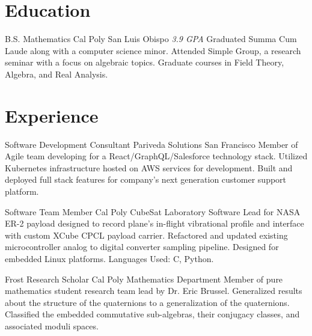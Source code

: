 \documentclass[letterpaper, 11pt, sans]{moderncv}
\begin{document}
\makecvtitle

\section{Education}
        {B.S. Mathematics}
        {Cal Poly}
        {San Luis Obispo}
        {\textit{3.9 GPA}}
        {
            Graduated Summa Cum Laude along with a computer science minor.\newline
            Attended Simple Group, a research seminar with a focus on algebraic topics.\newline
            Graduate courses in Field Theory, Algebra, and Real Analysis. \newline
        }

\section{Experience}

        {Software Development Consultant}
        {Pariveda Solutions}
        {San Francisco}{}
        {
            Member of Agile team developing for a React/GraphQL/Salesforce technology stack.\newline
            Utilized Kubernetes infrastructure hosted on AWS services for development.\newline
            Built and deployed full stack features for company's next generation customer support platform.\newline
        }

        {Software Team Member}
        {Cal Poly CubeSat Laboratory}{}{}
        {
            Software Lead for NASA ER-2 payload designed to record plane's in-flight vibrational profile and interface with custom XCube CPCL payload carrier.\newline
            Refactored and updated existing microcontroller analog to digital converter sampling pipeline.
            Designed for embedded Linux platforms. Languages Used: C, Python.\newline
        }

        {Frost Research Scholar}
        {Cal Poly Mathematics Department}{}{}
        {
            Member of pure mathematics student research team lead by Dr. Eric Brussel.\newline
            Generalized results about the structure of the quaternions to a generalization of the quaternions.\newline
            Classified the embedded commutative sub-algebras, their conjugacy classes, and associated moduli spaces.\newline 
        }
\end{document}
